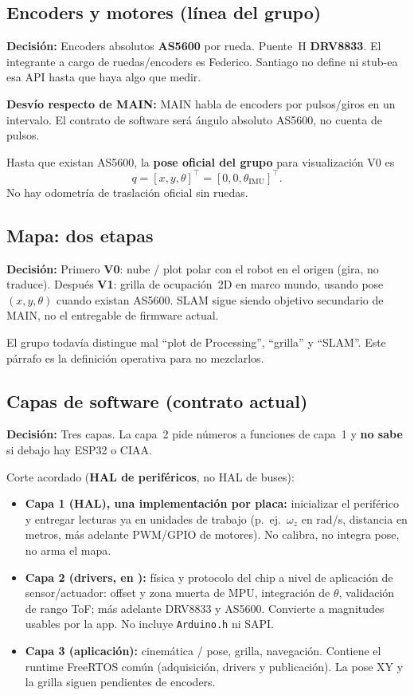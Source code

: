 \documentclass[11pt,a4paper]{article}
\newcommand{\ruta}[1]{\path{#1}}
\newcommand{\decision}[1]{\textbf{Decisi\'on:} #1}
\newcommand{\desvio}[1]{\textbf{Desv\'io respecto de MAIN:} #1}
\begin{document}
\subsection{Encoders y motores (l\'inea del grupo)}

\decision{Encoders absolutos \textbf{AS5600} por rueda. Puente~H
\textbf{DRV8833}. El integrante a cargo de ruedas/encoders es Federico.
Santiago no define ni stub-ea esa API hasta que haya algo que medir.}

\desvio{MAIN habla de encoders por pulsos/giros en un intervalo. El
contrato de software ser\'a \'angulo absoluto AS5600, no cuenta de pulsos.}

Hasta que existan AS5600, la \textbf{pose oficial del grupo} para visualizaci\'on
V0 es
\[
q = [x, y, \theta]^\top = [0, 0, \theta_{\mathrm{IMU}}]^\top.
\]
No hay odometr\'ia de traslaci\'on oficial sin ruedas.

\subsection{Mapa: dos etapas}

\decision{Primero \textbf{V0}: nube / plot polar con el robot en el origen
(gira, no traduce). Despu\'es \textbf{V1}: grilla de ocupaci\'on~2D en marco
mundo, usando pose $(x,y,\theta)$ cuando existan AS5600. SLAM sigue siendo
objetivo secundario de MAIN, no el entregable de firmware actual.}

El grupo todav\'ia distingue mal ``plot de Processing'', ``grilla'' y ``SLAM''.
Este p\'arrafo es la definici\'on operativa para no mezclarlos.

\subsection{Capas de software (contrato actual)}

\decision{Tres capas. La capa~2 pide n\'umeros a funciones de capa~1 y
\textbf{no sabe} si debajo hay ESP32 o CIAA.}

Corte acordado (\textbf{HAL de perif\'ericos}, no HAL de buses):

\begin{itemize}
  \item \textbf{Capa 1 (HAL), una implementaci\'on por placa:} inicializar
        el perif\'erico y entregar lecturas ya en unidades de trabajo
        (p.\ ej.\ $\omega_z$ en rad/s, distancia en metros, m\'as adelante
        PWM/GPIO de motores). No calibra, no integra pose, no arma el mapa.
  \item \textbf{Capa 2 (drivers, en \ruta{shared}):} f\'isica y protocolo
        del chip a nivel de aplicaci\'on de sensor/actuador: offset y zona
        muerta de MPU, integraci\'on de $\theta$, validaci\'on de rango ToF;
        m\'as adelante DRV8833 y AS5600. Convierte a magnitudes usables por
        la app. No incluye \texttt{Arduino.h} ni SAPI.
  \item \textbf{Capa 3 (aplicaci\'on):} cinem\'atica / pose, grilla, navegaci\'on.
        Contiene el runtime FreeRTOS com\'un (adquisici\'on, drivers y
        publicaci\'on). La pose XY y la grilla siguen pendientes de encoders.
\end{itemize}
\end{document}

